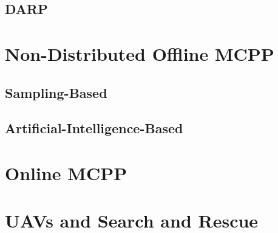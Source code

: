\subsection{DARP}

\section{Non-Distributed Offline MCPP}
\subsection{Sampling-Based}
\subsection{Artificial-Intelligence-Based}

\section{Online MCPP}


\section{UAVs and Search and Rescue}


